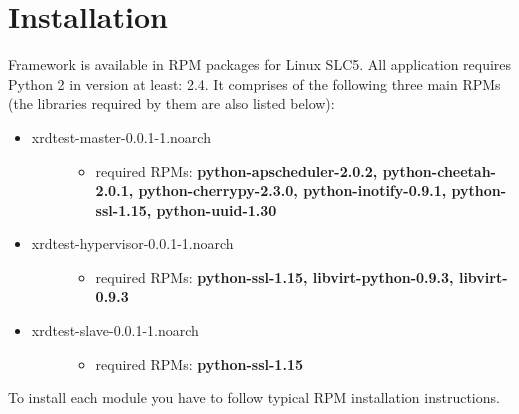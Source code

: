 \documentclass[letterpaper,10pt,english]{sphinxmanual}
\begin{document}
\chapter{Installation}
\label{installation:installation}\label{installation::doc}
Framework is available in RPM packages for Linux SLC5. All application requires
Python 2 in version at least: 2.4. It comprises of the following three main RPMs
(the libraries required by them are also listed below):
\begin{itemize}
\item {} \begin{description}
\item[{xrdtest-master-0.0.1-1.noarch}] \leavevmode\begin{itemize}
\item {} 
required RPMs: \textbf{python-apscheduler-2.0.2, python-cheetah-2.0.1, python-cherrypy-2.3.0,
python-inotify-0.9.1, python-ssl-1.15, python-uuid-1.30}

\end{itemize}

\end{description}

\item {} \begin{description}
\item[{xrdtest-hypervisor-0.0.1-1.noarch}] \leavevmode\begin{itemize}
\item {} 
required RPMs: \textbf{python-ssl-1.15, libvirt-python-0.9.3, libvirt-0.9.3}

\end{itemize}

\end{description}

\item {} \begin{description}
\item[{xrdtest-slave-0.0.1-1.noarch}] \leavevmode\begin{itemize}
\item {} 
required RPMs: \textbf{python-ssl-1.15}

\end{itemize}

\end{description}

\end{itemize}

To install each module you have to follow typical RPM installation instructions.
\end{document}
